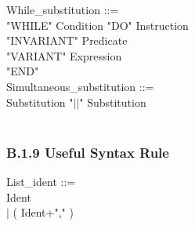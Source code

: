 \documentclass[12pt,a4paper,draft]{article}
\begin{document}
{\begin{sloppypar}
While\_substitution ::= \\ 
  \hspace*{0.20in}  "WHILE"  Condition  "DO"  Instruction \\ 
  \hspace*{0.20in}  "INVARIANT"  Predicate \\ 
  \hspace*{0.20in}  "VARIANT"  Expression  \\ 
  \hspace*{0.20in}  "END" \\ 
Simultaneous\_substitution ::= \\ 
  \hspace*{0.20in}   Substitution  "$||$"  Substitution\\ 
   \\ 
\end{sloppypar}
}
   
   
\subsubsection{B.1.9 Useful Syntax Rule} 
\footnotesize{
\begin{sloppypar} 
List\_ident ::=\\ 
\hspace*{0.20in} Ident\\ 
\hspace*{0.20in} $|$  ( Ident+"," )\\ 
\end{sloppypar}
}
\end{document}
